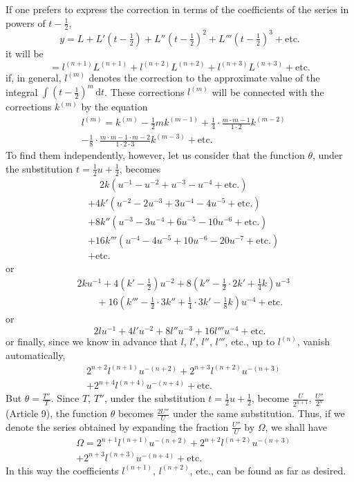 If one prefers to express the correction in terms of the coefficients of the series in powers of $t-\tfrac12$,
\[
y=L+L'(t-\tfrac12)+L''(t-\tfrac12)^2+L'''(t-\tfrac12)^3+\text{etc.}
\]
it will be
\[
=l^{(n+1)}L^{(n+1)}+l^{(n+2)}L^{(n+2)}+l^{(n+3)}L^{(n+3)}+\text{etc.}
\]
if, in general, $l^{(m)}$ denotes the correction to the approximate value of the integral $\int(t-\tfrac12)^m\,\mathrm{d}t$. These corrections $l^{(m)}$ will be connected with the corrections $k^{(m)}$ by the equation
\[
\begin{aligned}&l^{(m)}=k^{(m)}-\tfrac12mk^{(m-1)}+\tfrac14\cdot\frac{m\cdot m-1}{1\cdot2}k^{(m-2)}\\ &-\tfrac18\cdot\frac{m\cdot m-1\cdot m-2}{1\cdot2\cdot3}k^{(m-3)}+\text{etc.}\end{aligned}
\]
To find them independently, however, let us consider that the function $\theta$, under the substitution $t=\tfrac12u+\tfrac12$, becomes
\[
\begin{aligned}
&\phantom{{}+{}}2k(u^{-1}-u^{-2}+u^{-3}-u^{-4}+\text{etc.})\\
&+4k'(u^{-2}-2u^{-3}+3u^{-4}-4u^{-5}+\text{etc.})\\
&+8k''(u^{-3}-3u^{-4}+6u^{-5}-10u^{-6}+\text{etc.})\\
&+16k'''(u^{-4}-4u^{-5}+10u^{-6}-20u^{-7}+\text{etc.})\\
&+\text{etc.}
\end{aligned}
\]
or
\[
\begin{aligned}
&2ku^{-1}+4(k'-\tfrac12)u^{-2}+8(k''-\tfrac12\cdot2k'+\tfrac14k)u^{-3}\\
&\qquad+16(k'''-\tfrac12\cdot3k''+\tfrac14\cdot3k'-\tfrac18k)u^{-4}+\text{etc.}
\end{aligned}
\]
or
\[
2lu^{-1}+4l'u^{-2}+8l''u^{-3}+16l'''u^{-4}+\text{etc.}
\]
or finally, since we know in advance that $l$, $l'$, $l''$, $l'''$, etc., up to $l^{(n)}$, vanish automatically,
\[
\begin{aligned}&2^{n+2}l^{(n+1)}u^{-(n+2)}+2^{n+3}l^{(n+2)}u^{-(n+3)}\\ &+2^{n+4}l^{(n+4)}u^{-(n+4)}+\text{etc.}\end{aligned}
\]
But $\theta=\frac{T''}{T}$. Since $T$, $T''$, under the substitution $t=\tfrac12u+\tfrac12$, become $\frac{U}{2^{n+1}}$, $\frac{U''}{2^n}$ (Article 9), the function $\theta$ becomes $\frac{2U''}{U}$ under the same substitution. Thus, if we denote the series obtained by expanding the fraction $\frac{U''}{U}$ by $\Omega$, we shall have
\[
\begin{aligned}&\Omega=2^{n+1}l^{(n+1)}u^{-(n+2)}+2^{n+2}l^{(n+2)}u^{-(n+3)}\\ &+2^{n+3}l^{(n+3)}u^{-(n+4)}+\text{etc.}\end{aligned}
\]
In this way the coefficients $l^{(n+1)}$, $l^{(n+2)}$, etc., can be found as far as desired.


